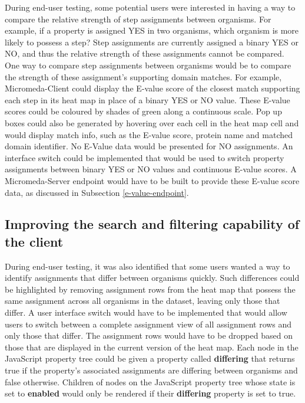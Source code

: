 During end-user testing, some potential users were interested in having a way to compare the relative strength of step assignments between organisms. For example, if a property is assigned YES in two organisms, which organism is more likely to possess a step? Step assignments are currently assigned a binary YES or NO, and thus the relative strength of these assignments cannot be compared. One way to compare step assignments between organisms would be to compare the strength of these assignment's supporting domain matches. For example, Micromeda-Client could display the E-value score of the closest match supporting each step in its heat map in place of a binary YES or NO value. These E-value scores could be coloured by shades of green along a continuous scale. Pop up boxes could also be generated by hovering over each cell in the heat map cell and would display match info, such as the E-value score, protein name and matched domain identifier. No E-Value data would be presented for NO assignments. An interface switch could be implemented that would be used to switch property assignments between binary YES or NO values and continuous E-value scores. A Micromeda-Server endpoint would have to be built to provide these E-value score data, as discussed in Subsection \ref{e-value-endpoint}.

\subsection{Improving the search and filtering capability of the client}

During end-user testing, it was also identified that some users wanted a way to identify assignments that differ between organisms quickly. Such differences could be highlighted by removing assignment rows from the heat map that possess the same assignment across all organisms in the dataset, leaving only those that differ. A user interface switch would have to be implemented that would allow users to switch between a complete assignment view of all assignment rows and only those that differ. The assignment rows would have to be dropped based on those that are displayed in the current version of the heat map. Each node in the JavaScript property tree could be given a property called \textbf{differing} that returns true if the property's associated assignments are differing between organisms and false otherwise. Children of nodes on the JavaScript property tree whose state is set to \textbf{enabled} would only be rendered if their  \textbf{differing} property is set to true.

